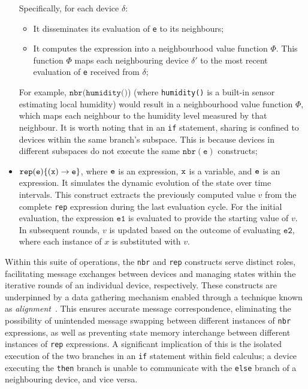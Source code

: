 \begin{itemize}
     Specifically, for each device $\delta$:
    \begin{itemize}
        \item It disseminates its evaluation of \texttt{e} to its neighbours;
        \item It computes the expression into a neighbourhood value function $\Phi$. This function $\Phi$ maps each neighbouring device $\delta'$ to the most recent evaluation of \texttt{e} received from $\delta$;
    \end{itemize}
    For example, $\texttt{nbr}(\texttt{humidity()}$) (where \texttt{humidity()} is a built-in sensor estimating local humidity) would result in a neighbourhood value function $\Phi$, 
    which maps each neighbour to the humidity level measured by that neighbour. 
    It is worth noting that in an \texttt{if} statement, 
    sharing is confined to devices within the same branch's subspace.
    This is because devices in different subspaces do not execute the same $\texttt{nbr}(\texttt{e})$ constructs;
    \item $\texttt{rep}(\texttt{e})\{(\texttt{x}) \rightarrow \texttt{e}\}$, where $\texttt{e}$ is an expression, $\texttt{x}$ is a variable, and $\texttt{e}$ is an expression. 
    It simulates the dynamic evolution of the state over time intervals. 
    This construct extracts the previously computed value \( v \) from the complete \texttt{rep} expression during the last evaluation cycle. 
    For the initial evaluation, the expression \( \texttt{e1} \) is evaluated to provide the starting value of \( v \). In subsequent rounds, 
    \( v \) is updated based on the outcome of evaluating \( \texttt{e2} \),
    where each instance of \( x \) is substituted with \( v \).
\end{itemize}
Within this suite of operations, 
 the \texttt{nbr} and \texttt{rep} constructs serve distinct roles, 
 facilitating message exchanges between devices and managing states within the iterative rounds of an individual device, respectively. 
%
These constructs are underpinned by a data gathering mechanism enabled through a technique known as \emph{alignment}~\cite{audrito2016run}. 
This ensures accurate message correspondence, 
 eliminating the possibility of unintended message swapping between different instances of \texttt{nbr} expressions, 
 as well as preventing state memory interchange between different instances of \texttt{rep} expressions. 
% 
A significant implication of this is the isolated execution of the two branches in an \texttt{if} statement within field calculus; 
  a device executing the \texttt{then} branch is unable to communicate with the \texttt{else} branch of a neighbouring device, and vice versa.
%
